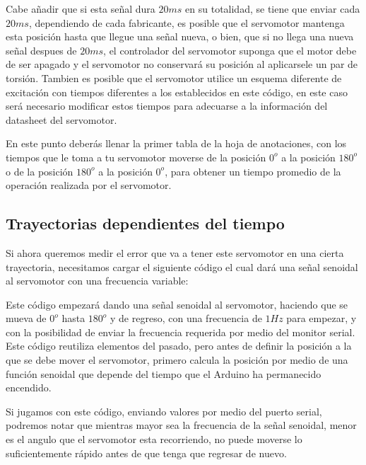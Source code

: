 		Cabe añadir que si esta señal dura $20ms$ en su totalidad, se tiene que enviar cada $20ms$, dependiendo de cada fabricante, es posible que el servomotor mantenga esta posición hasta que llegue una señal nueva, o bien, que si no llega una nueva señal despues de $20ms$, el controlador del servomotor suponga que el motor debe de ser apagado y el servomotor no conservará su posición al aplicarsele un par de torsión. Tambien es posible que el servomotor utilice un esquema diferente de excitación con tiempos diferentes a los establecidos en este código, en este caso será necesario modificar estos tiempos para adecuarse a la información del datasheet del servomotor.

		En este punto deberás llenar la primer tabla de la hoja de anotaciones, con los tiempos que le toma a tu servomotor moverse de la posición $0^o$ a la posición $180^o$ o de la posición $180^o$ a la posición $0^o$, para obtener un tiempo promedio de la operación realizada por el servomotor.

		\subsection{Trayectorias dependientes del tiempo}

		Si ahora queremos medir el error que va a tener este servomotor en una cierta trayectoria, necesitamos cargar el siguiente código el cual dará una señal senoidal al servomotor con una frecuencia variable:

		\begin{fullwidth}
			\begin{multicols}{2}
				
			\end{multicols}
		\end{fullwidth}

		Este código empezará dando una señal senoidal al servomotor, haciendo que se mueva de $0^o$ hasta $180^o$ y de regreso, con una frecuencia de $1Hz$ para empezar, y con la posibilidad de enviar la frecuencia requerida por medio del monitor serial. Este código reutiliza elementos del pasado, pero antes de definir la posición a la que se debe mover el servomotor, primero calcula la posición por medio de una función senoidal que depende del tiempo que el Arduino ha permanecido encendido.

		Si jugamos con este código, enviando valores por medio del puerto serial, podremos notar que mientras mayor sea la frecuencia de la señal senoidal, menor es el angulo que el servomotor esta recorriendo, no puede moverse lo suficientemente rápido antes de que tenga que regresar de nuevo.

